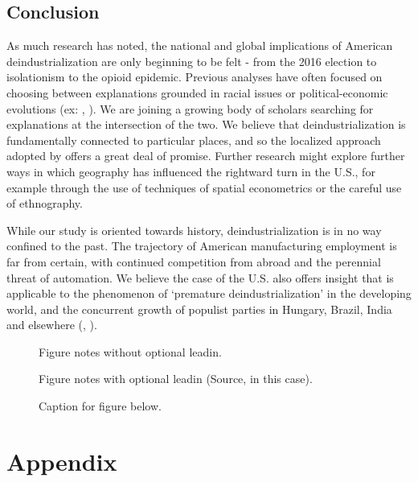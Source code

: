 \documentclass[]{AEA}
\begin{document}
\subsection{Conclusion}

As much research has noted, the national and global implications of
American deindustrialization are only beginning to be felt - from the
2016 election to isolationism to the opioid epidemic. Previous analyses
have often focused on choosing between explanations grounded in racial
issues or political-economic evolutions (ex: \cite{Green19},
\cite{Reny19}). We are joining a growing body of scholars searching for
explanations at the intersection of the two. We believe that
deindustrialization is fundamentally connected to particular places, and
so the localized approach adopted by \cite{Baccini21} offers a great
deal of promise. Further research might explore further ways in which
geography has influenced the rightward turn in the U.S., for example
through the use of techniques of spatial econometrics or the careful use
of ethnography.

While our study is oriented towards history, deindustrialization is in
no way confined to the past. The trajectory of American manufacturing
employment is far from certain, with continued competition from abroad
and the perennial threat of automation. We believe the case of the U.S.
also offers insight that is applicable to the phenomenon of `premature
deindustrialization' in the developing world, and the concurrent growth
of populist parties in Hungary, Brazil, India and elsewhere
(\cite{Rodrik15}, \cite{Castillo16}).

\begin{figure} \label{}
\caption{Caption for figure below.}

\begin{figurenotes}
Figure notes without optional leadin.
\end{figurenotes}
\begin{figurenotes}[Source]
Figure notes with optional leadin (Source, in this case).
\end{figurenotes}
\end{figure}

\nocite{Stargazer}




\appendix

\section{Appendix}
\end{document}
